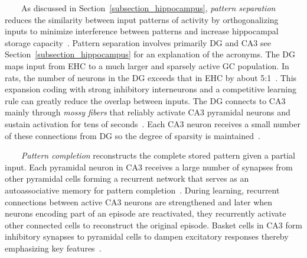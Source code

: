 
\begin{center}
  \begin{tcolorbox}[breakable,sharp corners=all,coltitle=black,colbacktitle=white,
    width=\textwidth,boxsep=5pt,left=5pt,right=5pt,
    title={\textbf{Box A: Pattern Separation, Completion and Integration}}]



~~~~As discussed in Section~\ref{subsection_hippocampus}, {\it{pattern separation}} reduces the similarity between input patterns of activity by orthogonalizing inputs to minimize interference between patterns and increase hippocampal storage capacity~\cite{KesnerandRollsNBR-15}. Pattern separation involves primarily DG and CA3 {\emdash{}} see Section~\ref{subsection_hippocampus} for an explanation of the acronyms. The DG maps input from EHC to a much larger and sparsely active GC population. In rats, the number of neurons in the DG exceeds that in EHC by about 5:1~\cite{DrewetalLEARNING-MEMORY-13}. This expansion coding with strong inhibitory interneurons and a competitive learning rule can greatly reduce the overlap between inputs. The DG connects to CA3 mainly through {\it{mossy fibers}} that reliably activate CA3 pyramidal neurons and sustain activation for tens of seconds~\cite{VyletaetalELIFE-16}. Each CA3 neuron receives a small number of these connections from DG so the degree of sparsity is maintained~\cite{KesnerandRollsNBR-15}.

~~~~{\it{Pattern completion}} reconstructs the complete stored pattern given a partial input. Each pyramidal neuron in CA3 receives a large number of synapses from other pyramidal cells forming a recurrent network that serves as an autoassociative memory for pattern completion~\cite{KesnerandRollsNBR-15}. During learning, recurrent connections between active CA3 neurons are strengthened and later when neurons encoding part of an episode are reactivated, they recurrently activate other connected cells to reconstruct the original episode. Basket cells in CA3 form inhibitory synapses to pyramidal cells to dampen excitatory responses thereby emphasizing key features~\cite{NeunuebelandKnierimNEURON-14}. 


\end{tcolorbox}
\end{center}
